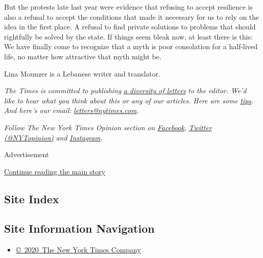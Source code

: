 But the protests late last year were evidence that refusing to accept
resilience is also a refusal to accept the conditions that made it
necessary for us to rely on the idea in the first place. A refusal to
find private solutions to problems that should rightfully be solved by
the state. If things seem bleak now, at least there is this: We have
finally come to recognize that a myth is poor consolation for a
half-lived life, no matter how attractive that myth might be.

Lina Mounzer is a Lebanese writer and translator.

\emph{The Times is committed to publishing}
\href{https://www.nytimes.com/2019/01/31/opinion/letters/letters-to-editor-new-york-times-women.html}{\emph{a
diversity of letters}} \emph{to the editor. We'd like to hear what you
think about this or any of our articles. Here are some}
\href{https://help.nytimes.com/hc/en-us/articles/115014925288-How-to-submit-a-letter-to-the-editor}{\emph{tips}}\emph{.
And here's our email:}
\href{mailto:letters@nytimes.com}{\emph{letters@nytimes.com}}\emph{.}

\emph{Follow The New York Times Opinion section on}
\href{https://www.facebook.com/nytopinion}{\emph{Facebook}}\emph{,}
\href{http://twitter.com/NYTOpinion}{\emph{Twitter (@NYTopinion)}}
\emph{and}
\href{https://www.instagram.com/nytopinion/}{\emph{Instagram}}\emph{.}

Advertisement

\protect\hyperlink{after-bottom}{Continue reading the main story}

\hypertarget{site-index}{%
\subsection{Site Index}\label{site-index}}

\hypertarget{site-information-navigation}{%
\subsection{Site Information
Navigation}\label{site-information-navigation}}

\begin{itemize}
\tightlist
\item
  \href{https://help.nytimes.com/hc/en-us/articles/115014792127-Copyright-notice}{©~2020~The
  New York Times Company}
\end{itemize}

